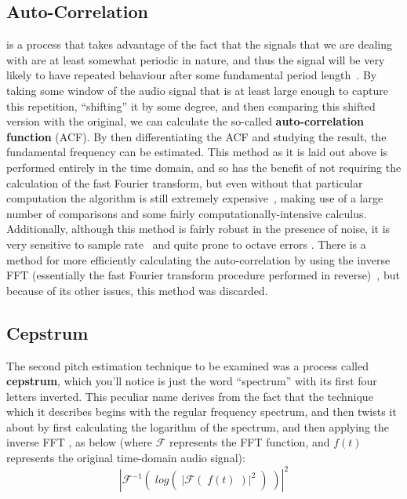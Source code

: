 \documentclass[12pt]{report}
\begin{document}
\subsection*{Auto-Correlation}
 is a process that takes advantage of the fact that the signals that we are dealing with are at least somewhat periodic in nature, and thus the signal will be very likely to have repeated behaviour after some fundamental period length~\cite{Middleton2003}. By taking some window of the audio signal that is at least large enough to capture this repetition, ``shifting'' it by some degree, and then comparing this shifted version with the original, we can calculate the so-called {\bf auto-correlation function} (ACF). By then differentiating the ACF and studying the result, the fundamental frequency can be estimated. This method as it is laid out above is performed entirely in the time domain, and so has the benefit of not requiring the calculation of the fast Fourier transform, but even without that particular computation the algorithm is still extremely expensive~\cite{delaCuadra-nd}, making use of a large number of comparisons and some fairly computationally-intensive calculus. Additionally, although this method is fairly robust in the presence of noise, it is very sensitive to sample rate~\cite{Middleton2003} and quite prone to octave errors \cite{Knesebeck2010}. There is a method for more efficiently calculating the auto-correlation by using the inverse FFT (essentially the fast Fourier transform procedure performed in reverse)~\cite{Middleton2003}, but because of its other issues, this method was discarded.
\clearpage
\subsection*{Cepstrum}
\indent The second pitch estimation technique to be examined was a process called {\bf cepstrum}, which you'll notice is just the word ``spectrum'' with its first four letters inverted. This peculiar name derives from the fact that the technique which it describes begins with the regular frequency spectrum, and then twists it about by first calculating the logarithm of the spectrum, and then applying the inverse FFT \cite{Norton2003}, as below (where $\mathcal{F}$ represents the FFT function, and $f(t)$ represents the original time-domain audio signal): 
$$| \mathcal{F}^{-1} (\; log(\;|\mathcal{F}(\;f(t)\;)|^2\;)\;)|^2$$
\end{document}
